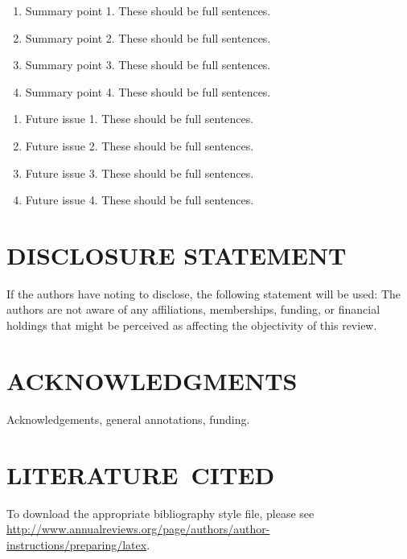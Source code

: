 \documentclass[letterpaper]{ar-1col}
\begin{document}
\begin{summary}
\begin{enumerate}
\item Summary point 1. These should be full sentences.
\item Summary point 2. These should be full sentences.
\item Summary point 3. These should be full sentences.
\item Summary point 4. These should be full sentences.
\end{enumerate}
\end{summary}

\begin{issues}
\begin{enumerate}
\item Future issue 1. These should be full sentences.
\item Future issue 2. These should be full sentences.
\item Future issue 3. These should be full sentences.
\item Future issue 4. These should be full sentences.
\end{enumerate}
\end{issues}

\section*{DISCLOSURE STATEMENT}
If the authors have noting to disclose, the following statement will be used: The authors are not aware of any affiliations, memberships, funding, or financial holdings that
might be perceived as affecting the objectivity of this review. 

\section*{ACKNOWLEDGMENTS}
Acknowledgements, general annotations, funding.

%
\section*{LITERATURE\ CITED}

To download the appropriate bibliography style file, please see \url{http://www.annualreviews.org/page/authors/author-instructions/preparing/latex}. 
\end{document}
